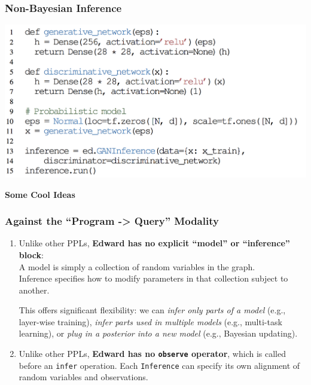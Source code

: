\documentclass[10pt,
               xcolor={usenames,dvipsnames},
               hyperref={colorlinks,linktoc=all,citecolor=Plum,linkcolor=MidnightBlue,urlcolor=MidnightBlue},noamssymb]{beamer}
\begin{document}
\begin{frame}
\frametitle{Non-Bayesian Inference}
\begin{center}
\vspace{-2ex}
\includegraphics[width=1.0\textwidth]{img/gan_example.png}
\end{center}
\end{frame}

\begin{frame}
\begin{center}
{\Large\bf Some Cool Ideas}
\end{center}
\end{frame}

\begin{frame}
\frametitle{Against the ``Program -> Query'' Modality}
\begin{enumerate}
\item
Unlike other PPLs, \textbf{Edward has no explicit ``model'' or ``inference''
block}: \\
A model is simply a collection of random variables in the graph.  \\
Inference specifies how to modify parameters in that
collection subject to another.

This offers significant flexibility: we can
\emph{infer only parts of a model} (e.g.,
layer-wise training),
\emph{infer parts used in multiple models}
(e.g., multi-task learning), or
\emph{plug in a posterior into a new model}
(e.g., Bayesian updating).
\item
Unlike other PPLs, \textbf{Edward has no \texttt{observe} operator}, which is called
before an \texttt{infer} operation.
Each \texttt{Inference} can specify its own alignment of random
variables and observations.
\end{enumerate}
\end{frame}
\end{document}
